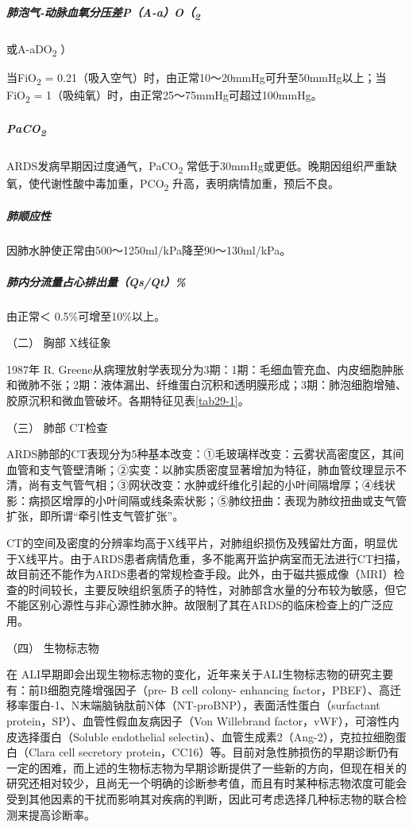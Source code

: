\subparagraph{肺泡气-动脉血氧分压差P（A-a）O（\textsubscript{2}}
或A-aDO\textsubscript{2} ）

当FiO\textsubscript{2} =
0.21（吸入空气）时，由正常10～20mmHg可升至50mmHg以上；当FiO\textsubscript{2}
= 1（吸纯氧）时，由正常25～75mmHg可超过100mmHg。

\subparagraph{PaCO\textsubscript{2}}

ARDS发病早期因过度通气，PaCO\textsubscript{2}
常低于30mmHg或更低。晚期因组织严重缺氧，使代谢性酸中毒加重，PCO\textsubscript{2}
升高，表明病情加重，预后不良。

\subparagraph{肺顺应性}

因肺水肿使正常由500～1250ml/kPa降至90～130ml/kPa。

\subparagraph{肺内分流量占心排出量（Qs/Qt）\%}

由正常＜ 0.5\%可增至10\%以上。

\hypertarget{text00078.htmlux5cux23CHP3-5-2-2-2}{}
（二） 胸部 X线征象

1987年 R.
Greene从病理放射学表现分为3期：1期：毛细血管充血、内皮细胞肿胀和微肺不张；2期：液体漏出、纤维蛋白沉积和透明膜形成；3期：肺泡细胞增殖、胶原沉积和微血管破坏。各期特征见表\ref{tab29-1}。

\hypertarget{text00078.htmlux5cux23CHP3-5-2-2-3}{}
（三） 肺部 CT检查

ARDS肺部的CT表现分为5种基本改变：①毛玻璃样改变：云雾状高密度区，其间血管和支气管壁清晰；②实变：以肺实质密度显著增加为特征，肺血管纹理显示不清，尚有支气管气相；③网状改变：水肿或纤维化引起的小叶间隔增厚；④线状影：病损区增厚的小叶间隔或线条索状影；⑤肺纹扭曲：表现为肺纹扭曲或支气管扩张，即所谓“牵引性支气管扩张”。

CT的空间及密度的分辨率均高于X线平片，对肺组织损伤及残留灶方面，明显优于X线平片。由于ARDS患者病情危重，多不能离开监护病室而无法进行CT扫描，故目前还不能作为ARDS患者的常规检查手段。此外，由于磁共振成像（MRI）检查的时间较长，主要反映组织氢质子的特性，对肺部含水量的分布较为敏感，但它不能区别心源性与非心源性肺水肿。故限制了其在ARDS的临床检查上的广泛应用。

\hypertarget{text00078.htmlux5cux23CHP3-5-2-2-4}{}
（四） 生物标志物

在
ALI早期即会出现生物标志物的变化，近年来关于ALI生物标志物的研究主要有：前B细胞克隆增强因子（pre-
B cell colony- enhancing
factor，PBEF）、高迁移率蛋白-1、N末端脑钠肽前N体（NT-proBNP），表面活性蛋白（surfactant
protein，SP）、血管性假血友病因子（Von Willebrand
factor，vWF），可溶性内皮选择蛋白（Soluble endothelial
selectin）、血管生成素2（Ang-2），克拉拉细胞蛋白（Clara cell secretory
protein，CC16）等。目前对急性肺损伤的早期诊断仍有一定的困难，而上述的生物标志物为早期诊断提供了一些新的方向，但现在相关的研究还相对较少，且尚无一个明确的诊断参考值，而且有时某种标志物浓度可能会受到其他因素的干扰而影响其对疾病的判断，因此可考虑选择几种标志物的联合检测来提高诊断率。

